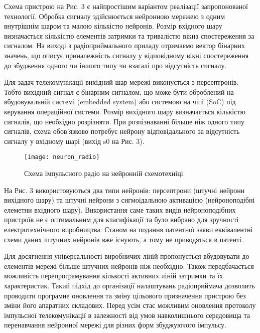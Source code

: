 Схема пристрою на Рис. 3 є найпростішим варіантом реалізації 
запропонованої технології. Обробка сигналу здійснюється нейронною 
мережею з одним внутрішнім шаром та малою кількістю нейронів. Розмір 
вхідного шару визначається кількістю елементів затримки та тривалістю 
вікна спостереження за сигналом. На виході з радіоприймального приладу 
отримаємо вектор бінарних значень, що описує приналежність сигналу у 
відповідному вікні спостереження до збудження одного чи іншого типу чи 
взагалі про відсутність сигналу. 

Для задач телекомунікації вихідний шар мережі виконується з персептронів. 
Тобто вихідний сигнал є бінарним сигналом, що може бути оброблений на 
вбудовувальній системі (embedded system) або системою на чіпі (SoC) 
під керування операційної системи. Розмір вихідного шару визначається 
кількістю сигналів, що необхідно розрізняти. При розпізнаванні більше 
ніж одного типу сигналів, схема обов'язково потребує нейрону 
відповідального за відсутність сигналу у вхідному шарі 
(вихід s0 на Рис. 3).

\begin{figure}[htbp] \begin{center}
\texttt{[image: neuron\_radio]}
\caption{Схема імпульсного радіо на нейронній схемотехніці} 
\label{fig:neural_radio}
\end{center} \end{figure}

На Рис. 3 використовуються два типи нейронів: персептрони 
(штучні нейрони вихідного шару) та штучні нейрони з сигмоідальною 
активацією (нейроноподібні елеметни вхідного шару). Використання саме 
таких видів нейроноподібних пристроїв не є оптимальним для класифікації 
та було вибрано для зручності електротехнічного виробництва. Станом на 
подання патентної заяви еквівалентні схеми даних штучних нейронів вже 
існують, а тому не приводяться в патенті.

Для досягнення універсальності виробничих ліній пропонується вбудовувати 
до елементів мережі більше штучних нейронів ніж необхідно. Також 
передбачається можливість перепрограмування кількості активних ліній 
затримки та їх характеристик. Такий підхід до організації налаштувань 
радіоприймача дозволить проводити програмне оновлення та зміну цільового 
призначення пристрою без зміни його апаратних складових.  Перед усім стає 
можливим оновлення протоколу імпульсної телекомунікації в залежності від 
умов навколишнього середовища та перенавчання нейронної мережі для різних 
форм збуджуючого імпульсу.

